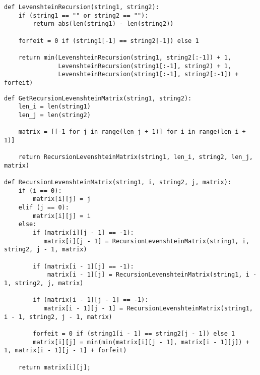 \documentclass[12pt]{report}
\begin{document}
\begin{lstlisting}[label=some-code,caption=Функция нахождения расстояния Левенштейна рекурсивно без матрицы]
def LevenshteinRecursion(string1, string2):
    if (string1 == "" or string2 == ""):
        return abs(len(string1) - len(string2))

    forfeit = 0 if (string1[-1] == string2[-1]) else 1

    return min(LevenshteinRecursion(string1, string2[:-1]) + 1,
               LevenshteinRecursion(string1[:-1], string2) + 1,
               LevenshteinRecursion(string1[:-1], string2[:-1]) + forfeit)
\end{lstlisting}


\begin{lstlisting}[label=some-code,caption=Функция нахождения расстояния Левенштейна рекурсивно с матрицей]
def GetRecursionLevenshteinMatrix(string1, string2):
    len_i = len(string1)
    len_j = len(string2)
    
    matrix = [[-1 for j in range(len_j + 1)] for i in range(len_i + 1)]

    return RecursionLevenshteinMatrix(string1, len_i, string2, len_j, matrix)

def RecursionLevenshteinMatrix(string1, i, string2, j, matrix):
    if (i == 0):
        matrix[i][j] = j
    elif (j == 0):
        matrix[i][j] = i
    else:
        if (matrix[i][j - 1] == -1):
           matrix[i][j - 1] = RecursionLevenshteinMatrix(string1, i, string2, j - 1, matrix)

        if (matrix[i - 1][j] == -1):
            matrix[i - 1][j] = RecursionLevenshteinMatrix(string1, i - 1, string2, j, matrix)

        if (matrix[i - 1][j - 1] == -1):
           matrix[i - 1][j - 1] = RecursionLevenshteinMatrix(string1, i - 1, string2, j - 1, matrix)

        forfeit = 0 if (string1[i - 1] == string2[j - 1]) else 1
        matrix[i][j] = min(min(matrix[i][j - 1], matrix[i - 1][j]) + 1, matrix[i - 1][j - 1] + forfeit)

    return matrix[i][j];
\end{lstlisting}
\end{document}
